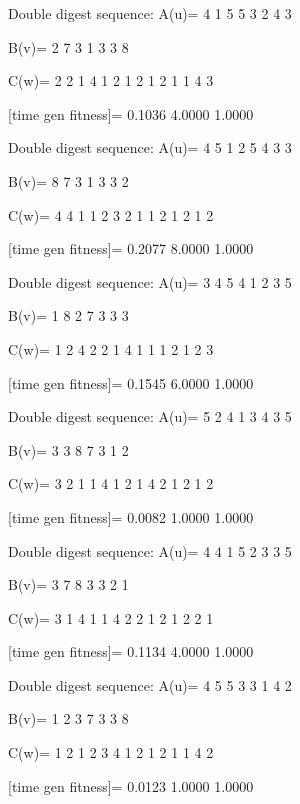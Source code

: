 Double digest sequence:
A(u)=
     4     1     5     5     3     2     4     3

B(v)=
     2     7     3     1     3     3     8

C(w)=
     2     2     1     4     1     2     1     2     1     2     1     1     4     3

[time gen fitness]=
    0.1036    4.0000    1.0000

Double digest sequence:
A(u)=
     4     5     1     2     5     4     3     3

B(v)=
     8     7     3     1     3     3     2

C(w)=
     4     4     1     1     2     3     2     1     1     2     1     2     1     2

[time gen fitness]=
    0.2077    8.0000    1.0000

Double digest sequence:
A(u)=
     3     4     5     4     1     2     3     5

B(v)=
     1     8     2     7     3     3     3

C(w)=
     1     2     4     2     2     1     4     1     1     1     2     1     2     3

[time gen fitness]=
    0.1545    6.0000    1.0000

Double digest sequence:
A(u)=
     5     2     4     1     3     4     3     5

B(v)=
     3     3     8     7     3     1     2

C(w)=
     3     2     1     1     4     1     2     1     4     2     1     2     1     2

[time gen fitness]=
    0.0082    1.0000    1.0000

Double digest sequence:
A(u)=
     4     4     1     5     2     3     3     5

B(v)=
     3     7     8     3     3     2     1

C(w)=
     3     1     4     1     1     4     2     2     1     2     1     2     2     1

[time gen fitness]=
    0.1134    4.0000    1.0000

Double digest sequence:
A(u)=
     4     5     5     3     3     1     4     2

B(v)=
     1     2     3     7     3     3     8

C(w)=
     1     2     1     2     3     4     1     2     1     2     1     1     4     2

[time gen fitness]=
    0.0123    1.0000    1.0000

